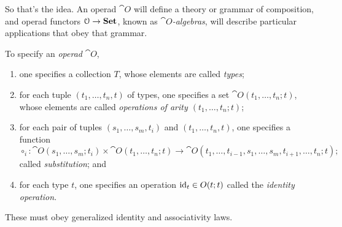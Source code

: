 \documentclass[7Sketches]{subfiles}
\begin{document}
So that's the idea. An operad $\cat{O}$ will define a theory or grammar of
composition, and operad functors $\mathcal{O}\to\mathbf{Set}$, known as
\emph{$\cat{O}$-algebras}, will describe particular applications that obey that
grammar.

\begin{roughDef}%
To specify an \emph{operad} $\cat O$,
\begin{enumerate}[label=(\roman*)]
\item one specifies a collection $T$, whose elements are called \emph{types};
\item for each tuple $(t_1,\dots,t_n,t)$ of types, one specifies a set $\cat
O(t_1,\dots,t_n;t)$, whose elements are called \emph{operations of arity
$(t_1,\dots,t_n;t)$};%
%
\item for each pair of tuples $(s_1,\dots,s_m,t_i)$ and $(t_1,\dots,t_n,t)$, one specifies a
function 
\[
\circ_i\colon \cat O(s_1,\dots,s_m;t_i) \times \cat O(t_1,\dots,t_n;t)
\to \cat O(t_1,\dots,t_{i-1},s_1,\dots,s_m,t_{i+1},\dots, t_n;t);
\]
called \emph{substitution}; and
\item for each type $t$, one specifies an operation $\mathrm{id}_t \in O(t;t)$ called the
\emph{identity operation}.
\end{enumerate}
These must obey generalized identity and associativity laws.%
\end{roughDef}%
\end{document}
